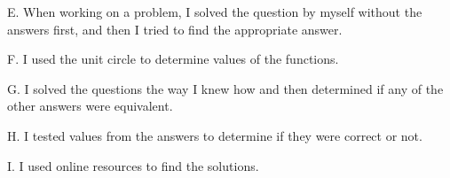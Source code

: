 \documentclass{ximera}
\begin{document}
\begin{question}
\begin{question}
\end{question}

\begin{question}
    
    E. When working on a problem, I solved the question by myself without the answers first, and then I tried to find the appropriate answer.

    \begin{multipleChoice}
    \end{multipleChoice}
    
\end{question}

\begin{question}
    
    F. I used the unit circle to determine values of the functions.

    \begin{multipleChoice}
    \end{multipleChoice}
    
\end{question}

\begin{question}
    
    G. I solved the questions the way I knew how and then determined if any of the other answers were equivalent.

    \begin{multipleChoice}
    \end{multipleChoice}
    
\end{question}

\begin{question}
    
    H. I tested values from the answers to determine if they were correct or not.

    \begin{multipleChoice}
    \end{multipleChoice}
    
\end{question}

\begin{question}    
    
    I. I used online resources to find the solutions.


\end{question}
\end{question}
\end{document}
